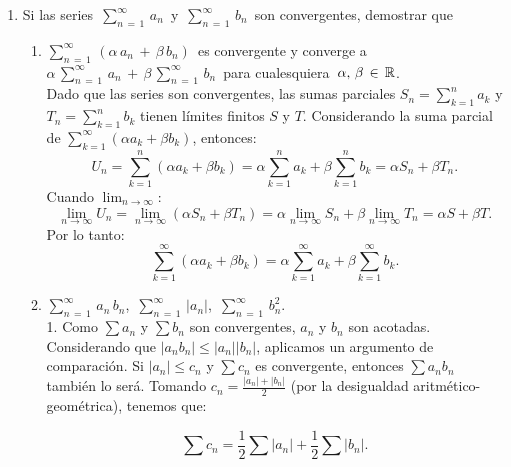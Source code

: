 \documentclass{article}
\begin{document}
\begin{enumerate}
\begin{enumerate}
Por lo tanto 
   \[
   x \in (0, 4).
   \]



\end{enumerate}

\item Si las series \,$\displaystyle\sum_{n\,=\,1}^\infty\,a_n$\, y \,$\displaystyle\sum_{n\,=\,1}^\infty\,b_n$\, son convergentes, demostrar que
    \begin{enumerate}
    \item $\displaystyle\sum_{n\,=\,1}^\infty\,(\alpha\,a_n\,+\,\beta\,b_n)$\, es convergente y converge a \,$\alpha\,\displaystyle\sum_{n\,=\,1}^\infty\,a_n\,+\,\beta\,\displaystyle\sum_{n\,=\,1}^\infty\,b_n$\, para cualesquiera \,$\alpha,\,\beta\,\in\,\mathbb R $.
\[\]
Dado que las series son convergentes, las sumas parciales \(S_n = \sum_{k=1}^n a_k\) y \(T_n = \sum_{k=1}^n b_k\) tienen límites finitos \(S\) y \(T\). Considerando la suma parcial de \(\sum_{k=1}^\infty (\alpha a_k + \beta b_k)\), entonces:
\[
U_n = \sum_{k=1}^n (\alpha a_k + \beta b_k) = \alpha \sum_{k=1}^n a_k + \beta \sum_{k=1}^n b_k = \alpha S_n + \beta T_n.
\]
Cuando \(\lim_{n \to \infty}\):
\[
\lim_{n \to \infty} U_n = \lim_{n \to \infty} (\alpha S_n + \beta T_n) = \alpha \lim_{n \to \infty} S_n + \beta \lim_{n \to \infty} T_n = \alpha S + \beta T.
\]
Por lo tanto:
\[
\sum_{k=1}^\infty (\alpha a_k + \beta b_k) = \alpha \sum_{k=1}^\infty a_k + \beta \sum_{k=1}^\infty b_k.
\]

    \item $\displaystyle\sum_{n\,=\,1}^\infty\,a_n\,b_n$, \,$\displaystyle\sum_{n\,=\,1}^\infty\,|a_n|$, \,$\displaystyle\sum_{n\,=\,1}^\infty\,b_n^2$.
\[\]
1. Como \(\sum a_n\) y \(\sum b_n\) son convergentes, \(a_n\) y \(b_n\) son acotadas. Considerando que \(|a_n b_n| \leq |a_n||b_n|\), aplicamos un argumento de comparación. Si \(|a_n| \leq c_n\) y \(\sum c_n\) es convergente, entonces \(\sum a_n b_n\) también lo será. Tomando \(c_n = \frac{|a_n| + |b_n|}{2}\) (por la desigualdad aritmético-geométrica), tenemos que:

\[
\sum c_n = \frac{1}{2} \sum |a_n| + \frac{1}{2} \sum |b_n|.
\]


\end{enumerate}
\end{enumerate}
\end{document}
